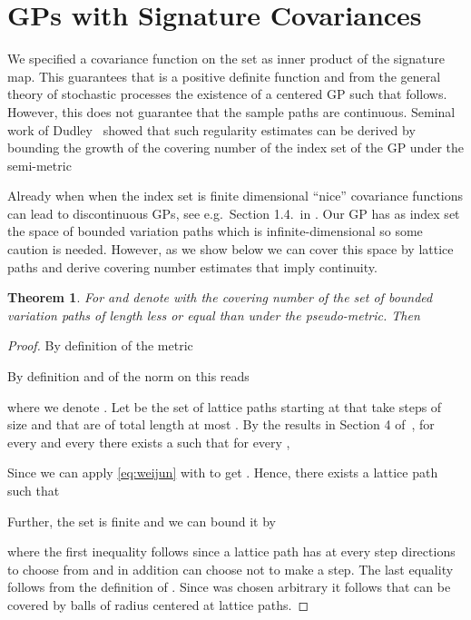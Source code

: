 \documentclass{article}
\newtheorem{theorem}{Theorem}
\begin{document}
 \section{GPs with Signature Covariances} \label{app:gpsig}
 We specified a covariance function  on the set  as inner product of the signature map.
 This guarantees that  is a positive definite function and from the general theory of stochastic processes the existence of a centered GP  such that  follows.  
 However, this does not guarantee that the sample paths  are continuous. 
 Seminal work of Dudley~\cite{dudley2010sample} showed that such regularity estimates can be derived by bounding the growth of the covering number of the index set of the GP  under the semi-metric
 
 Already when when the index set is finite dimensional ``nice'' covariance functions can lead to discontinuous GPs, see e.g.~Section 1.4.~in \cite{adler2009random}. 
 Our GP has as index set the space of bounded variation paths  which is infinite-dimensional so some caution is needed. 
 However, as we show below we can cover this space by lattice paths and derive covering number estimates that imply continuity.
\begin{theorem}\label{thm:covering}
  For  and  denote with  the covering number of the set
   of bounded variation paths of length less or equal than  under the  pseudo-metric.
  Then
  
  \end{theorem}
  \begin{proof}
    By definition of the metric 
    
    By definition  and of the norm  on  this reads 
    
   where we denote .
   Let  be the set of lattice paths starting at  that take steps of size  and that are of total length at most . 
By the results in Section 4 of~\cite{lyons2011inversion}, for every  and every  there exists a  such that for every , 

Since  we can apply \eqref{eq:weijun} with
 to get .
Hence, there exists a lattice path  such that

Further, the set  is finite and we can bound it by

 where the first inequality follows since a lattice path has at every step  directions to choose from and in addition can choose not to make a step.  
The last equality follows from the definition of .
Since  was chosen arbitrary it follows that  can be covered by  balls of radius  centered at lattice paths.
\end{proof}
\end{document}
